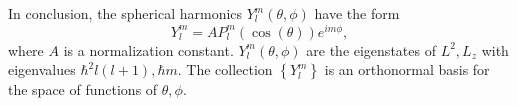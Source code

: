 \documentclass[phys334]{subfiles}
\begin{document}
    In conclusion, the spherical harmonics $Y_l^m\left( \theta,\phi \right)$ have the form
    \begin{equation*}
        Y_l^m = A P_l^m\left( \cos\left( \theta \right) \right)e^{im\phi},
    \end{equation*}
    where $A$ is a normalization constant. $Y_l^m\left( \theta,\phi \right)$ are the eigenstates of $L^{2},L_z$ with eigenvalues $\hbar^{2}l\left( l+1 \right),\hbar m$. The collection $\left\lbrace Y_l^m \right\rbrace$ is an orthonormal basis for the space of functions of $\theta,\phi$.
    


































    
    
    
    
    
\end{document}
